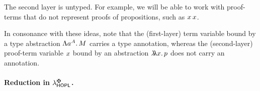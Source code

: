 The second layer is untyped.
For example, we will be able to work with proof-terms
that do not represent proofs of propositions,
such as $x\,x$.

In consonance with these ideas,
note that the (first-layer) term variable bound by a type abstraction
$\Lambda{a^{A}}.\,M$ carries a type annotation,
whereas the (second-layer) proof-term variable $x$ bound by an
abstraction $\lambda\!\!\lambda{x}.\,p$ does not carry an annotation.

\paragraph{Reduction in $\lambdaCheckHOPL$.}
